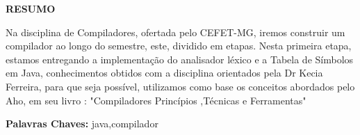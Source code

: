 \begin{center}
\uppercase{\textbf{\large{Resumo}}}
\end{center}
Na disciplina de Compiladores, ofertada pelo CEFET-MG, iremos construir um compilador ao longo do semestre, este, dividido em etapas. Nesta primeira etapa, estamos entregando a implementação do analisador léxico e a Tabela de Símbolos em Java, conhecimentos obtidos com a disciplina orientados pela Dr Kecia Ferreira, para que seja possível, utilizamos como base os conceitos abordados pelo Aho, em seu livro : "Compiladores Princípios ,Técnicas e Ferramentas"
\vspace{2cm}

\textbf{Palavras Chaves:} java,compilador

\vfill
\clearpage